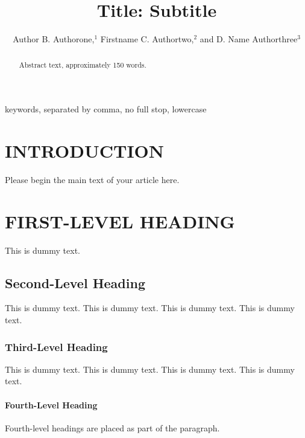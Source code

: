 \documentclass{ar-1col}
\begin{document}

\title{Title: Subtitle}


\author{Author B. Authorone,$^1$ Firstname C. Authortwo,$^2$ and D. Name Authorthree$^3$
}

\begin{abstract}
Abstract text, approximately 150 words. 
\end{abstract}

\begin{keywords}
keywords, separated by comma, no full stop, lowercase
\end{keywords}
\maketitle

\tableofcontents


\section{INTRODUCTION}
Please begin the main text of your article here. 



\section{FIRST-LEVEL HEADING}
This is dummy text. 
\subsection{Second-Level Heading}
This is dummy text. This is dummy text. This is dummy text. This is dummy text.

\subsubsection{Third-Level Heading}
This is dummy text. This is dummy text. This is dummy text. This is dummy text. 

\paragraph{Fourth-Level Heading} Fourth-level headings are placed as part of the paragraph.
\end{document}
